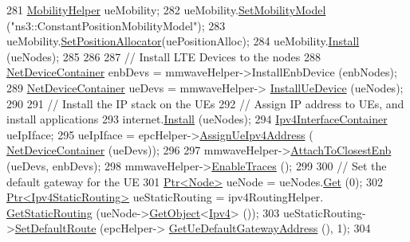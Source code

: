 \begin{DoxyCode}
281         \hyperlink{classns3_1_1MobilityHelper}{MobilityHelper} ueMobility;
282         ueMobility.\hyperlink{classns3_1_1MobilityHelper_a030275011b6f40682e70534d30280aba}{SetMobilityModel} (\textcolor{stringliteral}{"ns3::ConstantPositionMobilityModel"});
283         ueMobility.\hyperlink{classns3_1_1MobilityHelper_ac59d5295076be3cc11021566713a28c5}{SetPositionAllocator}(uePositionAlloc);
284         ueMobility.\hyperlink{classns3_1_1MobilityHelper_a07737960ee95c0777109cf2994dd97ae}{Install} (ueNodes);
285 
286 
287         \textcolor{comment}{// Install LTE Devices to the nodes}
288         \hyperlink{classns3_1_1NetDeviceContainer}{NetDeviceContainer} enbDevs = mmwaveHelper->InstallEnbDevice (enbNodes);
289         \hyperlink{classns3_1_1NetDeviceContainer}{NetDeviceContainer} ueDevs = mmwaveHelper->
      \hyperlink{classns3_1_1MmWaveHelper_a9311c819d7ee539c8710c5b7e98df37a}{InstallUeDevice} (ueNodes);
290 
291         \textcolor{comment}{// Install the IP stack on the UEs}
292         \textcolor{comment}{// Assign IP address to UEs, and install applications}
293         internet.\hyperlink{classns3_1_1InternetStackHelper_a6645b412f31283d2d9bc3d8a95cebbc0}{Install} (ueNodes);
294         \hyperlink{classns3_1_1Ipv4InterfaceContainer}{Ipv4InterfaceContainer} ueIpIface;
295         ueIpIface = epcHelper->\hyperlink{classns3_1_1MmWavePointToPointEpcHelper_ad96757d4c63d33f683dce1b5d6bca3b9}{AssignUeIpv4Address} (
      \hyperlink{classns3_1_1NetDeviceContainer}{NetDeviceContainer} (ueDevs));
296 
297         mmwaveHelper->\hyperlink{classns3_1_1MmWaveHelper_a202baea67b0af0d4fb6069de73766dc6}{AttachToClosestEnb} (ueDevs, enbDevs);
298         mmwaveHelper->\hyperlink{classns3_1_1MmWaveHelper_a4eae3871876b62965d612d9a56ed21bc}{EnableTraces} ();
299 
300         \textcolor{comment}{// Set the default gateway for the UE}
301         \hyperlink{classns3_1_1Ptr}{Ptr<Node>} ueNode = ueNodes.\hyperlink{classns3_1_1NodeContainer_a9ed96e2ecc22e0f5a3d4842eb9bf90bf}{Get} (0);
302         \hyperlink{classns3_1_1Ptr}{Ptr<Ipv4StaticRouting>} ueStaticRouting = ipv4RoutingHelper.
      \hyperlink{classns3_1_1Ipv4StaticRoutingHelper_a731206e50d305695dac7fb2ef963a4bb}{GetStaticRouting} (ueNode->\hyperlink{classns3_1_1Object_a13e18c00017096c8381eb651d5bd0783}{GetObject}<\hyperlink{classns3_1_1Ipv4}{Ipv4}> ());
303         ueStaticRouting->\hyperlink{classns3_1_1Ipv4StaticRouting_aee30fa3246c2b42f122dabdff2725331}{SetDefaultRoute} (epcHelper->
      \hyperlink{classns3_1_1MmWavePointToPointEpcHelper_afefac14ad79ff059b052305013d2beb3}{GetUeDefaultGatewayAddress} (), 1);
304 

\end{DoxyCode}

